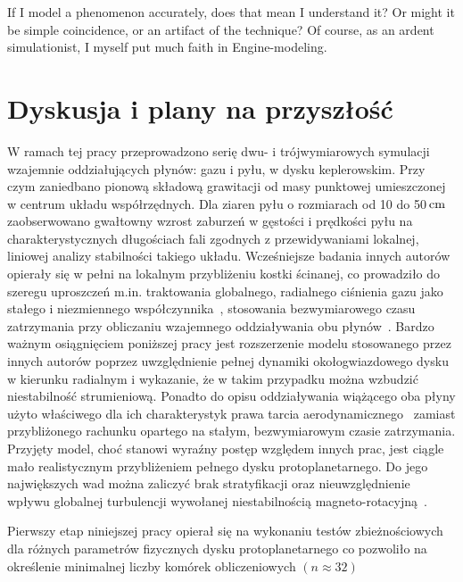 \begin{savequote}[75mm]
   If I model a phenomenon accurately, does that mean I understand it? Or might
   it be simple coincidence, or an artifact of the technique? Of course, as an
   ardent simulationist, I myself put much faith in Engine-modeling.
\end{savequote}

\chapter{Dyskusja i plany na przyszłość}
W ramach tej pracy przeprowadzono serię dwu- i trójwymiarowych symulacji
wzajemnie oddziałujących płynów: gazu i pyłu, w dysku keplerowskim. Przy czym
zaniedbano pionową składową grawitacji od masy punktowej umieszczonej w centrum
układu współrzędnych. Dla ziaren pyłu o rozmiarach od 10 do 50$\hbox{$\thinspace\textrm{cm}$}$
zaobserwowano gwałtowny wzrost zaburzeń w gęstości i prędkości pyłu na
charakterystycznych długościach fali zgodnych z przewidywaniami lokalnej,
liniowej analizy stabilności takiego układu. Wcześniejsze badania innych
autorów~\cite{YG05, JY07, TB09, BS10a, BS10b} opierały się w pełni na lokalnym
przybliżeniu kostki ścinanej, co prowadziło do szeregu uproszczeń m.in.
traktowania globalnego, radialnego ciśnienia gazu jako stałego i niezmiennego
współczynnika~\cite{N86}, stosowania bezwymiarowego czasu zatrzymania przy
obliczaniu wzajemnego oddziaływania obu płynów~\cite{YG05}. Bardzo ważnym
osiągnięciem poniższej pracy jest rozszerzenie modelu stosowanego przez innych
autorów poprzez uwzględnienie pełnej dynamiki okołogwiazdowego dysku w kierunku
radialnym i wykazanie, że w takim przypadku można wzbudzić niestabilność
strumieniową. Ponadto do opisu oddziaływania wiążącego oba płyny użyto
właściwego dla ich charakterystyk prawa tarcia aerodynamicznego~
zamiast przybliżonego rachunku opartego na stałym, bezwymiarowym czasie
zatrzymania. Przyjęty model, choć stanowi wyraźny postęp względem innych prac, jest
ciągle mało realistycznym przybliżeniem pełnego dysku protoplanetarnego. Do jego
największych wad można zaliczyć brak stratyfikacji oraz nieuwzględnienie wpływu
globalnej turbulencji wywołanej niestabilnością magneto-rotacyjną~\cite{DKJ14}. 
%
\par Pierwszy etap niniejszej pracy opierał się na wykonaniu testów
zbieżnościowych dla różnych parametrów fizycznych dysku protoplanetarnego co
pozwoliło na określenie minimalnej liczby komórek obliczeniowych $(n\approx32)$
